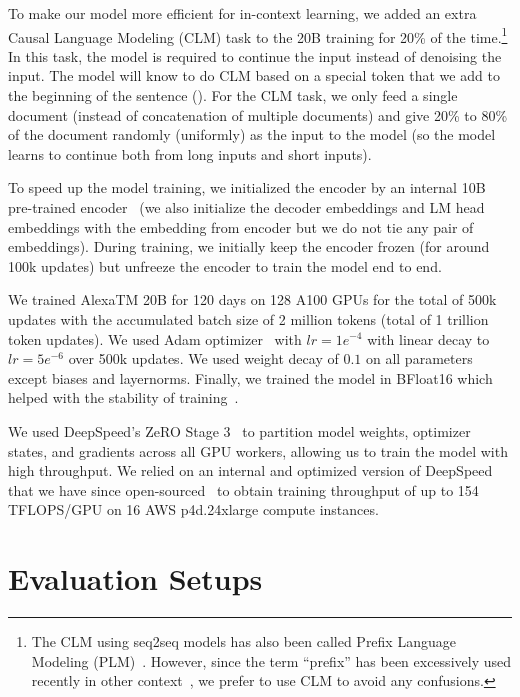 To make our model more efficient for in-context learning, we added an extra Causal Language Modeling (CLM) task to the 20B training for 20\% of the time.\footnote{The CLM using seq2seq models has also been called Prefix Language Modeling (PLM)~\citep{Raffel2020ExploringTL}. However, since the term ``prefix'' has been excessively used recently in other context~\citep{Li2021PrefixTuningOC}, we prefer to use CLM to avoid any confusions.} In this task, the model is required to continue the input instead of denoising the input. The model will know to do CLM based on a special token that we add to the beginning of the sentence ({\ttfamily [CLM]}). For the CLM task, we only feed a single document (instead of concatenation of multiple documents) and give 20\% to 80\% of the document randomly (uniformly) as the input to the model (so the model learns to continue both from long inputs and short inputs).

To speed up the model training, we initialized the encoder by an internal 10B pre-trained encoder~\cite{FitzGerald2022AlexaTM} (we also initialize the decoder embeddings and LM head embeddings with the embedding from encoder but we do not tie any pair of embeddings). During training, we initially keep the encoder frozen (for around 100k updates) but unfreeze the encoder to train the model end to end. 

We trained {AlexaTM 20B} for 120 days on 128 A100 GPUs for the total of 500k updates with the accumulated batch size of 2 million tokens (total of 1 trillion token updates). We used Adam optimizer~\citep{Kingma2015AdamAM} with $lr=1e^{-4}$ with linear decay to $lr=5e^{-6}$ over 500k updates. We used weight decay of $0.1$ on all parameters except biases and layernorms. Finally, we trained the model in {\ttfamily BFloat16} which helped with the stability of training~\citep{Raffel2020ExploringTL}.

We used DeepSpeed's ZeRO Stage 3~\citep{Rasley2020DeepSpeed} to partition model weights, optimizer states, and gradients across all GPU workers, allowing us to train the model with high throughput. We relied on an internal and optimized version of DeepSpeed that we have since open-sourced~\citep{chiu_zheng_2022} to obtain training throughput of up to 154 TFLOPS/GPU on 16 AWS p4d.24xlarge compute instances.

\section{Evaluation Setups}
\label{sec:eval}

